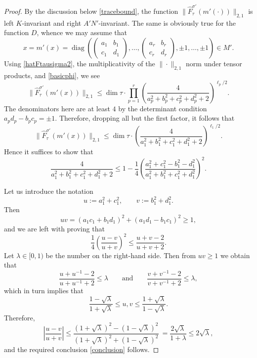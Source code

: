 \documentclass[11pt,oneside]{amsart}
\numberwithin{equation}{section}
\theoremstyle{remark}
\theoremstyle{plain}
\DeclareMathOperator{\diag}{diag}
\renewcommand\leq{\leqslant}
\renewcommand\geq{\geqslant}
\begin{document}
\begin{proof} By the discussion below \eqref{tracebound}, the function $\|\hat F_{\tau}^{\sigma'} (m'(\cdot))\|_{2,1}$ is left $K$-invariant and right $A'N'$-invariant. The same is obviously true for the function $D$, whence we may assume that
\[
x=m'(x)=\diag\left(\begin{pmatrix}a_1 & b_1 \\ c_1 & d_1 \end{pmatrix},\dotsc,\begin{pmatrix}a_r & b_r \\ c_r & d_r \end{pmatrix},\pm 1,\dotsc,\pm 1\right) \in M'.
\]
Using \eqref{hatFtausigma2}, the multiplicativity of the $\|\cdot\|_{2,1}$ norm under tensor products, and \eqref{basicphi}, we see
\[
\|\hat F_{\tau}^{\sigma'} (m'(x))\|_{2,1}\leq \dim\tau \cdot \prod_{p=1}^r \left(\frac{4}{a_p^2+b_p^2+c_p^2+d_p^2+2}\right)^{\ell_p/2}.
\]
The denominators here are at least $4$ by the determinant condition $a_pd_p-b_pc_p=\pm 1$. Therefore, dropping all but the first factor, it follows that
\[
\|\hat F_{\tau}^{\sigma'} (m'(x))\|_{2,1} \leq \dim \tau \cdot \left(\frac{4}{a_1^2+b_1^2+c_1^2+d_1^2+2}\right)^{\ell_1/2}.
\]
Hence it suffices to show that
\[\frac{4}{a_1^2+b_1^2+c_1^2+d_1^2+2}\leq 1-\frac{1}{4}\left(\frac{a_1^2+c_1^2-b_1^2-d_1^2}{a_1^2+b_1^2+c_1^2+d_1^2}\right)^2.\]

Let us introduce the notation
\[u:=a_1^2+c_1^2,\qquad v:=b_1^2+d_1^2.\]
Then
\[uv=(a_1c_1+b_1d_1)^2+(a_1d_1-b_1c_1)^2\geq 1,\]
and we are left with proving that
\begin{equation}
\label{conclusion}
\frac{1}{4}\left(\frac{u-v}{u+v}\right)^2\leq\frac{u+v-2}{u+v+2}.
\end{equation}
Let $\lambda\in[0,1)$ be the number on the right-hand side. Then from $uv\geq 1$ we obtain that
\[\frac{u+u^{-1}-2}{u+u^{-1}+2}\leq\lambda\qquad\text{and}\qquad \frac{v+v^{-1}-2}{v+v^{-1}+2}\leq\lambda,\]
which in turn implies that
\[\frac{1-\sqrt{\lambda}}{1+\sqrt{\lambda}}\leq u,v\leq\frac{1+\sqrt{\lambda}}{1-\sqrt{\lambda}}.\]
Therefore,
\[\left|\frac{u-v}{u+v}\right|\leq\frac{(1+\sqrt{\lambda})^2-(1-\sqrt{\lambda})^2}{(1+\sqrt{\lambda})^2+(1-\sqrt{\lambda})^2}\
=\frac{2\sqrt{\lambda}}{1+\lambda}\leq 2\sqrt{\lambda},\]
and the required conclusion \eqref{conclusion} follows.
\end{proof}
\end{document}
